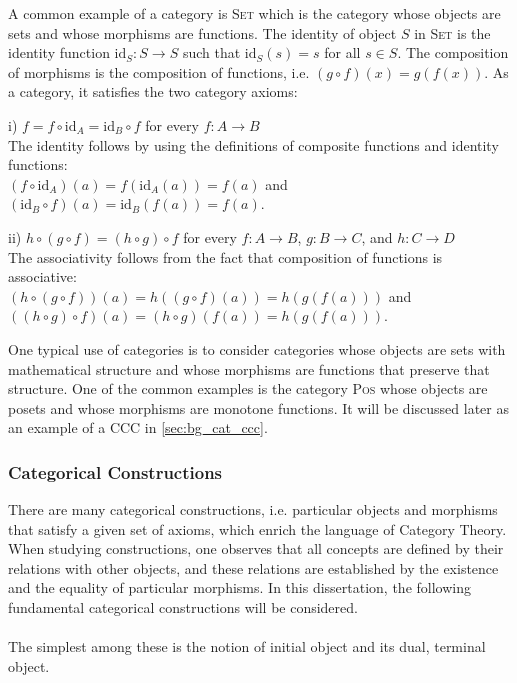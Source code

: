 A common example of a category is \textsc{Set} which is the category whose objects are sets and whose morphisms are functions. The identity of object $ S $ in \textsc{Set} is the identity function $ \text{id}_S : S \to S $ such that $ \text{id}_S(s) = s $ for all $ s \in S $. The composition of morphisms is the composition of functions, i.e. $ (g \circ f)(x) = g(f(x)) $. As a category, it satisfies the two category axioms:
\begin{myitemize}
\item[i)] $ f = f \circ \text{id}_A = \text{id}_B \circ f $ for every $ f: A \to B $\\
The identity follows by using the definitions of composite functions and identity functions:\\
$ (f \circ \text{id}_A)(a) = f(\text{id}_A(a)) = f(a) $ and $ (\text{id}_B \circ f)(a) = \text{id}_B(f(a)) = f(a) $.
\item[ii)] $ h \circ (g \circ f) = (h \circ g) \circ f $ for every $ f: A \to B $, $ g: B \to C$, and $ h: C \to D $\\
The associativity follows from the fact that composition of functions is associative:\\
$ (h \circ (g \circ f))(a) = h((g \circ f)(a)) = h(g(f(a))) $ and\\
$ ((h \circ g) \circ f)(a) = (h \circ g)(f(a)) = h(g(f(a))) $.
\end{myitemize}

One typical use of categories is to consider categories whose objects are sets with mathematical structure and whose morphisms are functions that preserve that structure. One of the common examples is the category \textsc{Pos} whose objects are posets and whose morphisms are monotone functions. It will be discussed later as an example of a CCC in \ref{sec:bg_cat_ccc}.


\subsubsection{Categorical Constructions}
\label{sec:bg_cat_cc}
There are many categorical constructions, i.e. particular objects and morphisms that satisfy a given set of axioms, which enrich the language of Category Theory. When studying constructions, one observes that all concepts are defined by their relations with other objects, and these relations are established by the existence and the equality of particular morphisms. In this dissertation, the following fundamental categorical constructions will be considered.
\\
\\
The simplest among these is the notion of initial object and its dual, terminal object.

